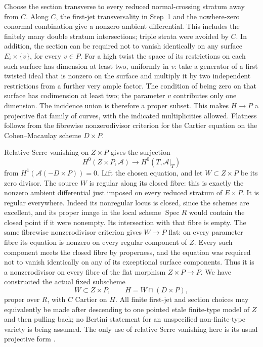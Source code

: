 Choose the section transverse to every reduced normal-crossing
stratum away from $C$.  Along $C$, the first-jet transversality in
Step~1 and the nowhere-zero conormal combination give a nonzero
ambient differential.  This includes the finitely many double
stratum intersections; triple strata were avoided by $C$.
In addition, the section can be required not to vanish identically
on any surface $E_i\times\{v\}$, for every $v\in P$.  For a high
twist the space of its restrictions on each such surface has
dimension at least two, uniformly in $v$: take a generator of
a first twisted ideal that is nonzero on the surface and multiply
it by two independent restrictions from a further very ample
factor.  The condition of being
zero on that surface has codimension at least two; the parameter
$v$ contributes only one dimension.  The incidence union is
therefore a proper subset.  This makes $H\to P$ a projective flat
family of curves, with the indicated multiplicities allowed.
Flatness follows from the fibrewise nonzerodivisor criterion for
the Cartier equation on the Cohen--Macaulay scheme $D\times P$.

Relative Serre vanishing on $Z\times P$ gives the surjection
\[
 H^0(Z\times P,\mathcal A)\longrightarrow H^0(T,\mathcal A|_T)
\]
from $H^1(\mathcal A(-D\times P))=0$.  Lift the chosen equation,
and let $W\subset Z\times P$ be its zero divisor.  The source
$W$ is regular along its closed fibre: this is exactly the
nonzero ambient differential just imposed on every reduced
stratum of $E\times P$.  It is regular everywhere.  Indeed its
nonregular locus is closed, since the schemes are excellent, and
its proper image in the local scheme $\operatorname{Spec}R$ would
contain the closed point if it were nonempty.  Its intersection
with that fibre is empty.  The same fibrewise nonzerodivisor
criterion gives $W\to P$ flat: on every parameter fibre its
equation is nonzero on every regular component of $Z$.  Every
such component meets the closed fibre by properness, and the
equation was required not to vanish identically on any of its
exceptional surface components.  Thus it is a nonzerodivisor on
every fibre of the flat morphism $Z\times P\to P$.
We have constructed the actual
fixed subscheme
\[
 W\subset Z\times P,\qquad H=W\cap(D\times P),
\]
proper over $R$, with $C$ Cartier on $H$.  All finite first-jet
and section choices may equivalently be made after descending to
one pointed etale finite-type model of $Z$ and then pulling back;
no Bertini statement for an unspecified non-finite-type variety
is being assumed.  The only use of relative Serre vanishing here
is its usual projective form
\citep[Lemma 30.17.1]{frC3azStacksSerre}.

